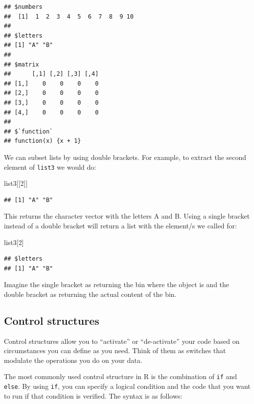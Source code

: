 \documentclass[
]{book}
\newenvironment{Shaded}{\begin{snugshade}}{\end{snugshade}}
\newcommand{\DecValTok}[1]{\textcolor[rgb]{0.00,0.00,0.81}{#1}}
\newcommand{\NormalTok}[1]{#1}
\begin{document}
\begin{verbatim}
## $numbers
##  [1]  1  2  3  4  5  6  7  8  9 10
## 
## $letters
## [1] "A" "B"
## 
## $matrix
##      [,1] [,2] [,3] [,4]
## [1,]    0    0    0    0
## [2,]    0    0    0    0
## [3,]    0    0    0    0
## [4,]    0    0    0    0
## 
## $`function`
## function(x) {x + 1}
\end{verbatim}

We can subset lists by using double brackets. For example, to extract the second
element of \texttt{list3} we would do:

\begin{Shaded}
\begin{Highlighting}[]
\NormalTok{list3[[}\DecValTok{2}\NormalTok{]]}
\end{Highlighting}
\end{Shaded}

\begin{verbatim}
## [1] "A" "B"
\end{verbatim}

This returns the character vector with the letters A and B. Using a single
bracket instead of a double bracket will return a list with the element/s we
called for:

\begin{Shaded}
\begin{Highlighting}[]
\NormalTok{list3[}\DecValTok{2}\NormalTok{]}
\end{Highlighting}
\end{Shaded}

\begin{verbatim}
## $letters
## [1] "A" "B"
\end{verbatim}

Imagine the single bracket as returning the bin where the object is and the
double bracket as returning the actual content of the bin.

\hypertarget{control-structures}{%
\subsection{Control structures}\label{control-structures}}

Control structures allow you to ``activate'' or ``de-activate'' your code based on
circumstances you can define as you need. Think of them as switches that
modulate the operations you do on your data.

The most commonly used control structure in R is the combination of \texttt{if} and
\texttt{else}. By using \texttt{if}, you can specify a logical condition and the code that you
want to run if that condition is verified. The syntax is as follows:
\end{document}
